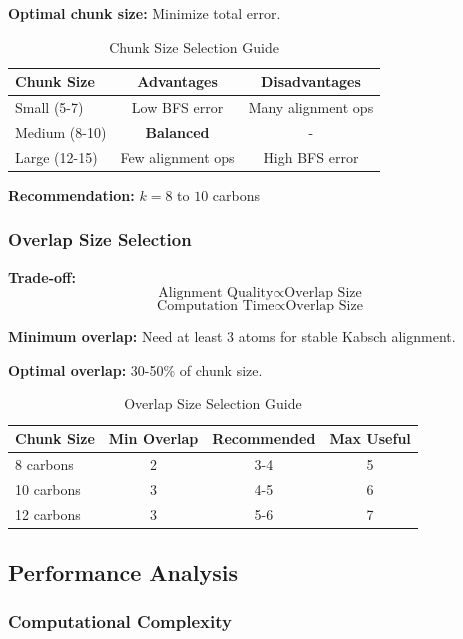 \documentclass[11pt,a4paper]{article}
\begin{document}
\textbf{Optimal chunk size:} Minimize total error.

\begin{table}[h]
\centering
\caption{Chunk Size Selection Guide}
\begin{tabular}{lcc}
\toprule
Chunk Size & Advantages & Disadvantages \\
\midrule
Small (5-7) & Low BFS error & Many alignment ops \\
Medium (8-10) & \textbf{Balanced} & - \\
Large (12-15) & Few alignment ops & High BFS error \\
\bottomrule
\end{tabular}
\end{table}

\textbf{Recommendation:} $k = 8$ to $10$ carbons

\subsubsection{Overlap Size Selection}

\textbf{Trade-off:}
\begin{equation}
\text{Alignment Quality} \propto \text{Overlap Size}
\end{equation}
\begin{equation}
\text{Computation Time} \propto \text{Overlap Size}
\end{equation}

\textbf{Minimum overlap:} Need at least 3 atoms for stable Kabsch alignment.

\textbf{Optimal overlap:} 30-50\% of chunk size.

\begin{table}[h]
\centering
\caption{Overlap Size Selection Guide}
\begin{tabular}{lccc}
\toprule
Chunk Size & Min Overlap & Recommended & Max Useful \\
\midrule
8 carbons & 2 & 3-4 & 5 \\
10 carbons & 3 & 4-5 & 6 \\
12 carbons & 3 & 5-6 & 7 \\
\bottomrule
\end{tabular}
\end{table}

\subsection{Performance Analysis}

\subsubsection{Computational Complexity}
\end{document}
